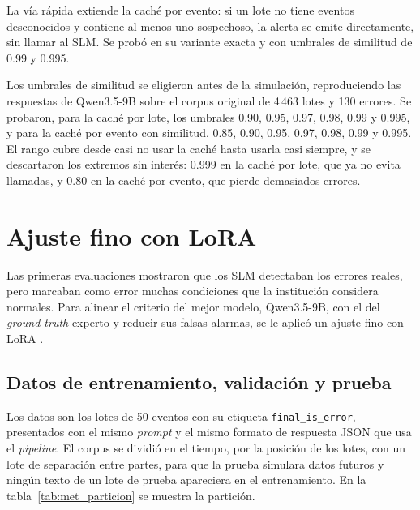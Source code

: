 

La vía rápida extiende la caché por evento: si un lote no tiene eventos desconocidos y contiene al menos uno sospechoso, la alerta se emite directamente, sin llamar al SLM. Se probó en su variante exacta y con umbrales de similitud de 0.99 y 0.995.


Los umbrales de similitud se eligieron antes de la simulación, reproduciendo las respuestas de Qwen3.5-9B sobre el corpus original de 4\,463 lotes y 130 errores. Se probaron, para la caché por lote, los umbrales 0.90, 0.95, 0.97, 0.98, 0.99 y 0.995, y para la caché por evento con similitud, 0.85, 0.90, 0.95, 0.97, 0.98, 0.99 y 0.995. El rango cubre desde casi no usar la caché hasta usarla casi siempre, y se descartaron los extremos sin interés: 0.999 en la caché por lote, que ya no evita llamadas, y 0.80 en la caché por evento, que pierde demasiados errores.

\section{Ajuste fino con LoRA}\label{sec:met_finetuning}

Las primeras evaluaciones mostraron que los SLM detectaban los errores reales, pero marcaban como error muchas condiciones que la institución considera normales. Para alinear el criterio del mejor modelo, Qwen3.5-9B, con el del \textit{ground truth} experto y reducir sus falsas alarmas, se le aplicó un ajuste fino con LoRA \cite{hu2022_lora}.

\subsection{Datos de entrenamiento, validación y prueba}

Los datos son los lotes de 50 eventos con su etiqueta \texttt{final\_is\_error}, presentados con el mismo \textit{prompt} y el mismo formato de respuesta JSON que usa el \textit{pipeline}. El corpus se dividió en el tiempo, por la posición de los lotes, con un lote de separación entre partes, para que la prueba simulara datos futuros y ningún texto de un lote de prueba apareciera en el entrenamiento. En la tabla~\ref{tab:met_particion} se muestra la partición.

